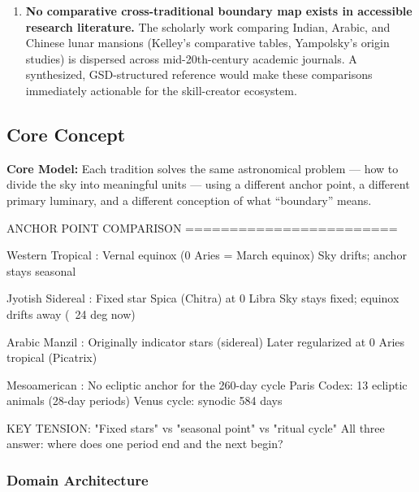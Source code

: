 \documentclass[11pt,letterpaper]{article}
\begin{document}
\begin{enumerate}
  \item \textbf{No comparative cross-traditional boundary map exists in accessible research literature.} The scholarly work comparing Indian, Arabic, and Chinese lunar mansions (Kelley's comparative tables, Yampolsky's origin studies) is dispersed across mid-20th-century academic journals. A synthesized, GSD-structured reference would make these comparisons immediately actionable for the skill-creator ecosystem.
\end{enumerate}

\subsection{Core Concept}

\textbf{Core Model:} Each tradition solves the same astronomical problem --- how to divide the sky into meaningful units --- using a different anchor point, a different primary luminary, and a different conception of what ``boundary'' means.

\begin{asciibox}
ANCHOR POINT COMPARISON
========================

Western Tropical   : Vernal equinox (0 Aries = March equinox)
                     Sky drifts; anchor stays seasonal

Jyotish Sidereal   : Fixed star Spica (Chitra) at 0 Libra
                     Sky stays fixed; equinox drifts away (~24 deg now)

Arabic Manzil      : Originally indicator stars (sidereal)
                     Later regularized at 0 Aries tropical (Picatrix)

Mesoamerican       : No ecliptic anchor for the 260-day cycle
                     Paris Codex: 13 ecliptic animals (28-day periods)
                     Venus cycle: synodic 584 days

KEY TENSION: "Fixed stars" vs "seasonal point" vs "ritual cycle"
             All three answer: where does one period end and the next begin?
\end{asciibox}

\subsubsection{Domain Architecture}
\end{document}
